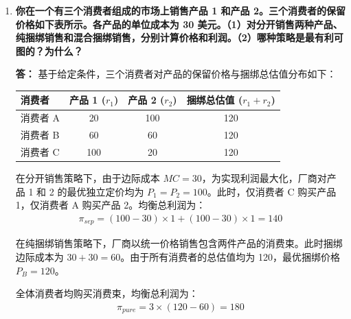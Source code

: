 \begin{enumerate}[label=\textbf{\arabic*.}, leftmargin=*]
		（3）企业在租赁与销售间的帕累托最优决策主要取决于以下三大核心要素的权衡：
		\begin{enumerate}
			\item \textbf{价格歧视的剩余榨取空间}：通过租赁衍生的两部收费制所捕获的消费者剩余总量，是否显著超过一次性销售带来的即期利润。
			\item \textbf{相对贴现率差异}：若 IBM 的内部资金贴现率高于其目标客户群的贴现率，即期回笼大量现金流的销售模式更具吸引力；反之则倾向于长期获取租赁稳定现金流。
			\item \textbf{市场结构的脆弱性与进入威胁}：当面临竞争对手强烈的进入威胁时，直接出售能迅速抢占并固化市场份额，构建用户转换壁垒；若自身处于稳固的绝对垄断地位，则更倾向于通过租赁追求长期剩余最大化。
		\end{enumerate}
		
		\item \textbf{你在一个有三个消费者组成的市场上销售产品 1 和产品 2。三个消费者的保留价格如下表所示。各产品的单位成本为 30 美元。（1）对分开销售两种产品、纯捆绑销售和混合捆绑销售，分别计算价格和利润。（2）哪种策略是最有利可图的？为什么？}
		
		\textbf{答：}
		基于给定条件，三个消费者对产品的保留价格与捆绑总估值分布如下：
		
		\begin{center}
			\renewcommand{\arraystretch}{1.1}
			\begin{tabular}{lccc}
				\toprule
				消费者 & 产品 1 ($r_1$) & 产品 2 ($r_2$) & 捆绑总估值 ($r_1+r_2$) \\
				\midrule
				消费者 A & 20 & 100 & 120 \\
				消费者 B & 60 & 60 & 120 \\
				消费者 C & 100 & 20 & 120 \\
				\bottomrule
			\end{tabular}
		\end{center}
		
		在分开销售策略下，由于边际成本 $MC=30$，为实现利润最大化，厂商对产品 1 和 2 的最优独立定价均为 $P_1 = P_2 = 100$。此时，仅消费者 C 购买产品 1，仅消费者 A 购买产品 2。均衡总利润为：
		\[
		\begin{aligned}
			\pi_{sep} = (100 - 30) \times 1 + (100 - 30) \times 1 = 140
		\end{aligned}
		\]
		
		在纯捆绑销售策略下，厂商以统一价格销售包含两件产品的消费束。此时捆绑边际成本为 $30+30=60$。由于所有消费者的总估值均为 120，最优捆绑价格 $P_B = 120$。
		
		全体消费者均购买消费束，均衡总利润为：
		\[
		\begin{aligned}
			\pi_{pure} = 3 \times (120 - 60) = 180
		\end{aligned}
		\]
		

\end{enumerate}
